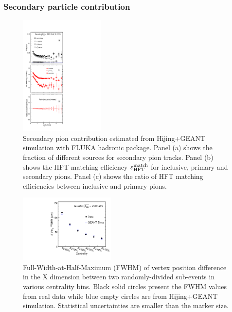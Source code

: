 \documentclass[%
 reprint,	
showpacs,
 amsmath,amssymb,
 aps,
 prc,
]{revtex4-1}
\begin{document}
\subsubsection{Secondary particle contribution}
\label{correction:hft:secondary}

\begin{figure}[h]
\centering
\includegraphics[width=0.38\textwidth, angle = 0]{fig/Fraction_Pion_2.pdf}
  \caption{Secondary pion contribution estimated from Hijing+GEANT simulation with FLUKA hadronic package. Panel (a) shows the fraction of different sources for secondary pion tracks. Panel (b) shows the HFT matching efficiency $\varepsilon_{\rm HFT}^{\rm match}$ for inclusive, primary and secondary pions. Panel (c) shows the ratio of HFT matching efficiencies between inclusive and primary pions.}
\label{fig:Fraction_Pion} 
\end{figure}

\begin{figure}
\centering
\includegraphics[width=0.43\textwidth]{fig/vtxX_vsCent.pdf}
\caption{Full-Width-at-Half-Maximum (FWHM) of vertex position difference in the X dimension between two randomly-divided sub-events in various centrality bins. Black solid circles present the FWHM values from real data while blue empty circles are from Hijing+GEANT simulation. Statistical uncertainties are smaller than the marker size.}
\label{fig:vtxX_vsCent} 
\end{figure}
\end{document}
